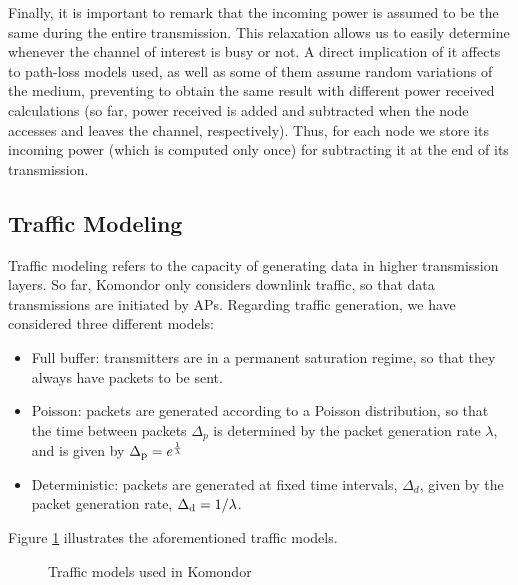 \documentclass[a4paper]{article}
\begin{document}
		Finally, it is important to remark that the incoming power is assumed to be the same during the entire transmission. This relaxation allows us to easily determine whenever the channel of interest is busy or not. A direct implication of it affects to path-loss models used, as well as some of them assume random variations of the medium, preventing to obtain the same result with different power received calculations (so far, power received is added and subtracted when the node accesses and leaves the channel, respectively). Thus, for each node we store its incoming power (which is computed only once) for subtracting it at the end of its transmission. 
	
	\subsection{Traffic Modeling}
	\label{section:traffic_modelling}
	Traffic modeling refers to the capacity of generating data in higher transmission layers. So far, Komondor only considers downlink traffic, so that data transmissions are initiated by APs. Regarding traffic generation, we have considered three different models:
	\begin{itemize}
		\item Full buffer: transmitters are in a permanent saturation regime, so that they always have packets to be sent.
		\item Poisson: packets are generated according to a Poisson distribution, so that the time between packets $\Delta_p$ is determined by the packet generation rate $\lambda$, and is given by $\Delta_{\rm p} = e^{\frac{1}{\lambda}}$
		\item Deterministic: packets are generated at fixed time intervals, $\Delta_d$, given by the packet generation rate, $\Delta_{\rm d} = 1/\lambda$.
	\end{itemize}

	Figure \ref{fig:traffic_models} illustrates the aforementioned traffic models. 
	\begin{figure}[h!]
		\centering
		\caption{Traffic models used in Komondor}
		\label{fig:traffic_models}
	\end{figure}	
	
\end{document}
